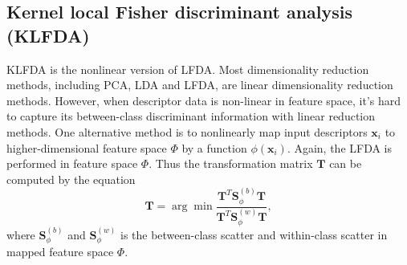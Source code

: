 \subsection{Kernel local Fisher discriminant analysis (KLFDA)}

KLFDA  \cite{KLFDA} is the nonlinear version of LFDA. Most dimensionality reduction methods, including PCA, LDA and LFDA, are linear dimensionality reduction methods. However, when descriptor data is non-linear in feature space, it's hard to capture its between-class discriminant information with linear reduction methods. One alternative method is to nonlinearly map input descriptors $\bm{x}_i$ to higher-dimensional feature space $\Phi$ by a function $\phi(\bm{x}_i)$. Again, the LFDA is performed in feature space $\Phi$. Thus the transformation matrix $\bm{T}$ can be computed by the equation
\begin{equation}
\bm{T} = \arg \min \frac{\bm{T}^T\bm{S}^{(b)}_{\phi}\bm{T}}{\bm{T}^T\bm{S}^{(w)}_{\phi}\bm{T}},
\end{equation}
where $\bm{S}^{(b)}_{\phi}$ and $\bm{S}^{(w)}_{\phi}$ is the between-class scatter and within-class scatter in mapped feature space $\Phi$.

